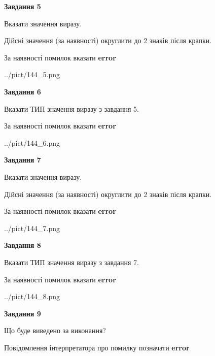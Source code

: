 \documentclass[11pt, ukrainian]{article}
\begin{document}
{\begin {large}
{\begin {center}\textbf{Завдання 5}\end {center}}\par
Вказати значення виразу. \par
Дійсні значення (за наявності) округлити до 2 знаків після крапки. \par
За наявності помилок вказати \textbf{error}

\begin{center}
	{../pict/144_5.png}
\end{center}
\newpage

{\begin {center}\textbf{Завдання 6}\end {center}}\par
Вказати ТИП значення виразу з завдання 5. \par
За наявності помилок вказати \textbf{error}

\begin{center}
	{../pict/144_6.png}
\end{center}
\newpage

{\begin {center}\textbf{Завдання 7}\end {center}}\par
Вказати значення виразу. \par
Дійсні значення (за наявності) округлити до 2 знаків після крапки. \par
За наявності помилок вказати \textbf{error}

\begin{center}
	{../pict/144_7.png}
\end{center}
\newpage

{\begin {center}\textbf{Завдання 8}\end {center}}\par
Вказати ТИП значення виразу з завдання 7. \par
За наявності помилок вказати \textbf{error}

\begin{center}
	{../pict/144_8.png}
\end{center}
\newpage

{\begin {center}\textbf{Завдання 9}\end {center}}\par
Що буде виведено за виконання? \par
Повідомлення інтерпретатора про помилку позначати \textbf{error}


\end{large}}
\end{document}
